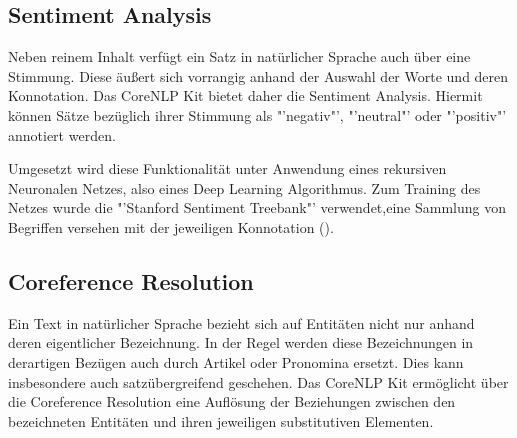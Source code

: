 \subsection{Sentiment Analysis}
Neben reinem Inhalt verfügt ein Satz in natürlicher Sprache auch über eine Stimmung. Diese äußert sich vorrangig anhand der Auswahl der Worte und deren Konnotation. Das CoreNLP Kit bietet daher die Sentiment Analysis. Hiermit können Sätze bezüglich ihrer Stimmung als "'negativ"', "'neutral"' oder "'positiv"' annotiert werden.\par
Umgesetzt wird diese Funktionalität unter Anwendung eines rekursiven Neuronalen Netzes, also eines Deep Learning Algorithmus. Zum Training des Netzes wurde die "'Stanford Sentiment Treebank"' verwendet,eine Sammlung von Begriffen versehen mit der jeweiligen Konnotation (\cite[vgl.][1]{SOCHERSENTIMENT}).

\subsection{Coreference Resolution}
Ein Text in natürlicher Sprache bezieht sich auf Entitäten nicht nur anhand deren eigentlicher Bezeichnung. In der Regel werden diese Bezeichnungen in derartigen Bezügen auch durch Artikel oder Pronomina ersetzt. Dies kann insbesondere auch satzübergreifend geschehen. Das CoreNLP Kit ermöglicht über die Coreference Resolution eine Auflösung der Beziehungen zwischen den bezeichneten Entitäten und ihren jeweiligen substitutiven Elementen. 
